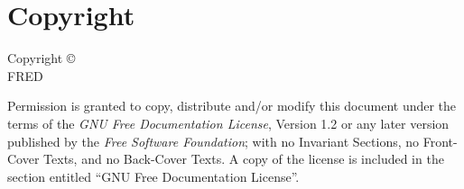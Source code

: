\documentclass[12pt,openany]{book}
\begin{document}
\frontmatter

\chapter*{Copyright}
Copyright \copyright\ \\
FRED

Permission is granted to copy, distribute and/or modify this document under the terms of the \emph{GNU Free Documentation License}, Version 1.2 or any later version published by the \emph{Free Software Foundation}; with no Invariant Sections, no Front-Cover Texts, and no Back-Cover Texts.
A copy of the license is included in the section entitled ``GNU Free Documentation License''.

\tableofcontents



\mainmatter





%



%
\end{document}
